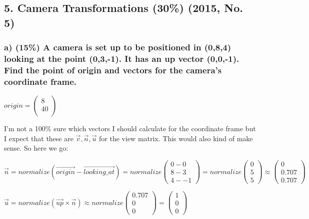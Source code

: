 \subsection{5.  Camera Transformations (30\%) (2015, No. 5)} 
\subsubsection{a)  (15\%) A camera is set up to be positioned in (0,8,4) looking at the point (0,3,-1). It has an up vector (0,0,-1). Find the point of origin and vectors for the camera's coordinate frame.}

$
    origin
=
    \left(\begin{array}{c}
        8\\
        4
        0\\
    \end{array}\right)
$

I'm not a 100\% sure which vectors I should calculate for the coordinate frame but I expect that these are $ \vec{v}, \vec{n}, \vec{u} $ for the view matrix. This would also kind of make sense. So here we go:

$ 
    \vec{n}
=
    normalize(\vec{origin} - \vec{looking\_at})
=
    normalize\left(\begin{array}{c}
        0 - 0 \\
        8 - 3 \\
        4 - -1
    \end{array}\right) 
= 
    normalize\left(\begin{array}{c}
        0 \\
        5 \\
        5
    \end{array}\right)
\approx
    \left(\begin{array}{c}
        0\\
        0.707\\
        0.707
    \end{array}\right)
$

$
    \vec{u}
=
    normalize\left( \vec{up} \times \vec{n} \right)
\approx
    normalize\left(\begin{array}{c}
        0.707\\
        0\\
        0
    \end{array}\right)
=
    \left(\begin{array}{c}
        1\\
        0\\
        0
    \end{array}\right)
$

